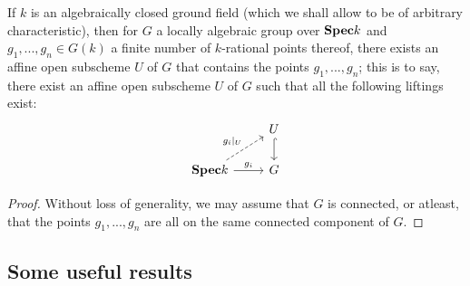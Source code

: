                 \begin{proposition}
                    If $k$ is an algebraically closed ground field (which we shall allow to be of arbitrary characteristic), then for $G$ a locally algebraic group over $\mathbf{Spec} k$ and $g_1, ..., g_n \in G(k)$ a finite number of $k$-rational points thereof, there exists an affine open subscheme $U$ of $G$ that contains the points $g_1, ..., g_n$; this is to say, there exist an affine open subscheme $U$ of $G$ such that all the following liftings exist:
                        $$
                            \begin{tikzcd}
                            	& U \\
                            	{\Spec k} & G
                            	\arrow[hook, from=1-2, to=2-2]
                            	\arrow["{g_i}", from=2-1, to=2-2]
                            	\arrow["{g_i|_U}", dashed, from=2-1, to=1-2]
                            \end{tikzcd}
                        $$
                \end{proposition}
                    \begin{proof}
                        Without loss of generality, we may assume that $G$ is connected, or atleast, that the points $g_1, ..., g_n$ are all on the same connected component of $G$.   
                    \end{proof}
                    
        \subsection{Some useful results}
